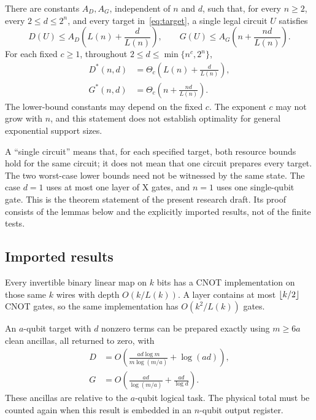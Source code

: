 \begin{theorem}\label{thm:main}
There are constants $A_D,A_G$, independent of $n$ and $d$, such that, for every $n\ge2$, every $2\le d\le2^n$, and every target in~\eqref{eq:target}, a single legal circuit $U$ satisfies
\begin{equation}\label{eq:mainupper}
D(U)\le A_D\left(L(n)+\frac d{L(n)}\right),\qquad
G(U)\le A_G\left(n+\frac{nd}{L(n)}\right).
\end{equation}
For each fixed $c\ge1$, throughout $2\le d\le\min\{n^c,2^n\}$,
\begin{equation}\label{eq:mainlower}
\begin{aligned}
D^*(n,d)&=\Theta_c\left(L(n)+\frac d{L(n)}\right),\\
G^*(n,d)&=\Theta_c\left(n+\frac{nd}{L(n)}\right).
\end{aligned}
\end{equation}
The lower-bound constants may depend on the fixed $c$. The exponent $c$ may not grow with $n$, and this statement does not establish optimality for general exponential support sizes.
\end{theorem}

A ``single circuit'' means that, for each specified target, both resource bounds hold for the same circuit; it does not mean that one circuit prepares every target. The two worst-case lower bounds need not be witnessed by the same state. The case $d=1$ uses at most one layer of X gates, and $n=1$ uses one single-qubit gate. This is the theorem statement of the present research draft. Its proof consists of the lemmas below and the explicitly imported results, not of the finite tests.

\subsection{Imported results}
\begin{fact}\label{fact:linear}
Every invertible binary linear map on $k$ bits has a CNOT implementation on those same $k$ wires with depth $O(k/L(k))$\cite[Theorem~1.1]{jiang2020}. A layer contains at most $\left\lfloor k/2\right\rfloor$ CNOT gates, so the same implementation has $O(k^2/L(k))$ gates.
\end{fact}

\begin{fact}\label{fact:tradeoff}
An $a$-qubit target with $d$ nonzero terms can be prepared exactly using $m\ge6a$ clean ancillas, all returned to zero, with\cite[Theorem~1]{luo2025}
\begin{align}
D&=O\left(\frac{ad\log m}{m\log(m/a)}+\log(ad)\right),\label{eq:tradeoffdepth}\\
G&=O\left(\frac{ad}{\log(m/a)}+\frac{ad}{\log d}\right).\label{eq:tradeoffsize}
\end{align}
These ancillas are relative to the $a$-qubit logical task. The physical total must be counted again when this result is embedded in an $n$-qubit output register.
\end{fact}

